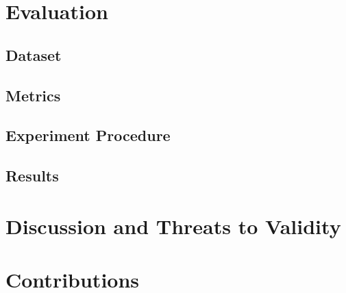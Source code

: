 \documentclass[conference]{IEEEtran}
\begin{document}
\section{Evaluation}
\label{sec:evaluation}

\subsection{Dataset}
\label{sec:dataset}

\subsection{Metrics}
\label{sec:metrics}

\subsection{Experiment Procedure}
\label{sec:experiment-procedure}

\subsection{Results}
\label{sec:results}

\section{Discussion and Threats to Validity}
\label{sec:dicussion}

\section{Contributions}
\label{sec:contributions}



\end{document}
